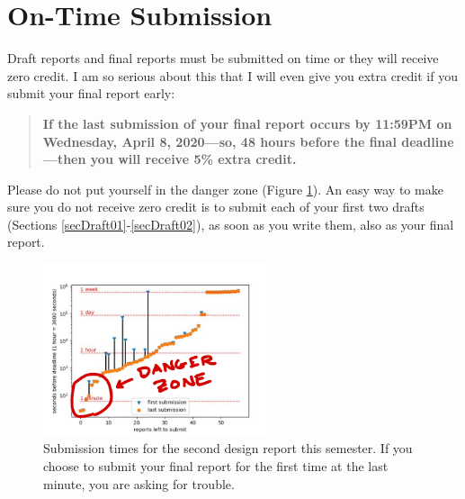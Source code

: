 \documentclass[conf]{new-aiaa}
\begin{document}
\section{On-Time Submission}

Draft reports and final reports must be submitted on time or they will receive zero credit. I am so serious about this that I will even give you extra credit if you submit your final report early:
\begin{quote}
\textbf{If the last submission of your final report occurs by 11:59PM on Wednesday, April 8, 2020---so, 48 hours before the final deadline---then you will receive 5\% extra credit.}
\end{quote}
Please do not put yourself in the danger zone (Figure \ref{figSubTimes}). An easy way to make sure you do not receive zero credit is to submit each of your first two drafts (Sections \ref{secDraft01}-\ref{secDraft02}), as soon as you write them, also as your final report.

\begin{figure}[h!]
\begin{center}
\includegraphics[width=0.6\textwidth]{submission_times_DP02}
\caption{Submission times for the second design report this semester. If you choose to submit your final report for the first time at the last minute, you are asking for trouble.}
\label{figSubTimes}
\end{center}
\end{figure}






\end{document}
